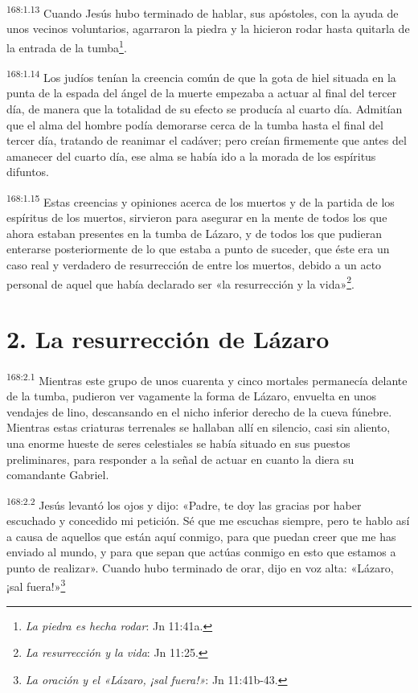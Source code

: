 \par
\textsuperscript{168:1.13} Cuando Jesús hubo terminado de hablar, sus apóstoles, con la ayuda de unos vecinos voluntarios, agarraron la piedra y la hicieron rodar hasta quitarla de la entrada de la tumba\footnote{\textit{La piedra es hecha rodar}: Jn 11:41a.}.

\par
\textsuperscript{168:1.14} Los judíos tenían la creencia común de que la gota de hiel situada en la punta de la espada del ángel de la muerte empezaba a actuar al final del tercer día, de manera que la totalidad de su efecto se producía al cuarto día. Admitían que el alma del hombre podía demorarse cerca de la tumba hasta el final del tercer día, tratando de reanimar el cadáver; pero creían firmemente que antes del amanecer del cuarto día, ese alma se había ido a la morada de los espíritus difuntos.

\par
\textsuperscript{168:1.15} Estas creencias y opiniones acerca de los muertos y de la partida de los espíritus de los muertos, sirvieron para asegurar en la mente de todos los que ahora estaban presentes en la tumba de Lázaro, y de todos los que pudieran enterarse posteriormente de lo que estaba a punto de suceder, que éste era un caso real y verdadero de resurrección de entre los muertos, debido a un acto personal de aquel que había declarado ser «la resurrección y la vida»\footnote{\textit{La resurrección y la vida}: Jn 11:25.}.

\section*{2. La resurrección de Lázaro}
\par
\textsuperscript{168:2.1} Mientras este grupo de unos cuarenta y cinco mortales permanecía delante de la tumba, pudieron ver vagamente la forma de Lázaro, envuelta en unos vendajes de lino, descansando en el nicho inferior derecho de la cueva fúnebre. Mientras estas criaturas terrenales se hallaban allí en silencio, casi sin aliento, una enorme hueste de seres celestiales se había situado en sus puestos preliminares, para responder a la señal de actuar en cuanto la diera su comandante Gabriel.

\par
\textsuperscript{168:2.2} Jesús levantó los ojos y dijo: «Padre, te doy las gracias por haber escuchado y concedido mi petición. Sé que me escuchas siempre, pero te hablo así a causa de aquellos que están aquí conmigo, para que puedan creer que me has enviado al mundo, y para que sepan que actúas conmigo en esto que estamos a punto de realizar». Cuando hubo terminado de orar, dijo en voz alta: «Lázaro, ¡sal fuera!»\footnote{\textit{La oración y el «Lázaro, ¡sal fuera!»}: Jn 11:41b-43.}

